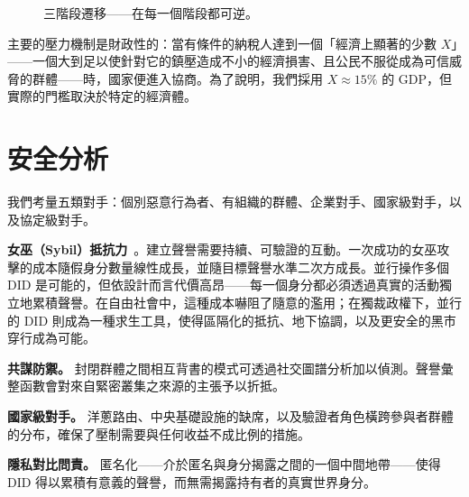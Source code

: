 \documentclass[11pt,a4paper,twocolumn]{article}
\begin{document}
\begin{figure}[ht]
\centering
{}
\caption{三階段遷移——在每一個階段都可逆。}
\label{fig:migration}
\end{figure}

主要的壓力機制是財政性的：當有條件的納稅人達到一個「經濟上顯著的少數 $X$」——一個大到足以使針對它的鎮壓造成不小的經濟損害、且公民不服從成為可信威脅的群體——時，國家便進入協商。為了說明，我們採用 $X \approx 15\%$ 的 GDP，但實際的門檻取決於特定的經濟體。

\section{安全分析}

我們考量五類對手：個別惡意行為者、有組織的群體、企業對手、國家級對手，以及協定級對手。

\textbf{女巫（Sybil）抵抗力}~\cite{douceur2002}。建立聲譽需要持續、可驗證的互動。一次成功的女巫攻擊的成本隨假身分數量線性成長，並隨目標聲譽水準二次方成長。並行操作多個 DID 是可能的，但依設計而言代價高昂——每一個身分都必須透過真實的活動獨立地累積聲譽。在自由社會中，這種成本嚇阻了隨意的濫用；在獨裁政權下，並行的 DID 則成為一種求生工具，使得區隔化的抵抗、地下協調，以及更安全的黑市穿行成為可能。

\textbf{共謀防禦。} 封閉群體之間相互背書的模式可透過社交圖譜分析加以偵測。聲譽彙整函數會對來自緊密叢集之來源的主張予以折抵。

\textbf{國家級對手。} 洋蔥路由、中央基礎設施的缺席，以及驗證者角色橫跨參與者群體的分布，確保了壓制需要與任何收益不成比例的措施。

\textbf{隱私對比問責。} 匿名化——介於匿名與身分揭露之間的一個中間地帶——使得 DID 得以累積有意義的聲譽，而無需揭露持有者的真實世界身分。
\end{document}
